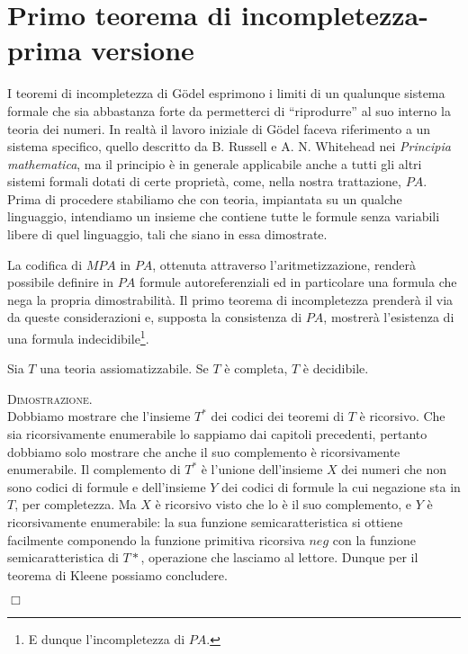 \section{Primo teorema di incompletezza-prima versione}

	I teoremi di incompletezza di G\"odel esprimono i limiti di un qualunque
	sistema formale che sia abbastanza forte da permetterci di ``riprodurre''
	al suo interno la teoria dei numeri. In realt\`a il lavoro iniziale di G\"odel
	faceva riferimento a un sistema specifico, quello descritto da B. Russell e
	A. N. Whitehead nei \textit{Principia ma\-the\-ma\-ti\-ca}, ma il principio
	\`e in generale applicabile anche a tutti gli altri sistemi formali dotati di
	certe propriet\`a, come, nella nostra trattazione, $PA$.\\
	Prima di procedere stabiliamo che con teoria, impiantata su un qualche
	linguaggio, intendiamo un insieme che contiene tutte le formule senza
	variabili libere di quel linguaggio, tali che siano in essa dimostrate.
		
	La codifica di $MPA$ in $PA$, ottenuta attraverso l'aritmetizzazione,
	render\`a possibile definire in $PA$ formule autoreferenziali ed in
	particolare una formula che nega la propria dimostrabilit\`a. Il primo
	teorema di incompletezza prender\`a il via da queste considerazioni e,
	supposta la consistenza di $PA$, mostrer\`a l'esistenza di una formula
	indecidibile\footnote{E dunque l'incompletezza di $PA$.}.

	\begin{prop}
	Sia $T$ una teoria assiomatizzabile. Se $T$ \`e completa, $T$ \`e decidibile.
	\end{prop}
	
	\textsc{Dimostrazione.}\\
	Dobbiamo mostrare che l'insieme $T^*$ dei codici dei teoremi di $T$
	\`e ricorsivo. Che sia ricorsivamente enumerabile lo sappiamo dai
	capitoli precedenti, pertanto dobbiamo solo mostrare che anche il
	suo complemento \`e ricorsivamente enumerabile. Il complemento di
	$T^*$ \`e l'unione dell'insieme $X$ dei numeri che non sono codici
	di formule e dell'insieme $Y$ dei codici di formule la cui negazione
	sta in $T$, per completezza. Ma $X$ \`e ricorsivo visto che lo \`e
	il suo complemento, e $Y$ \`e ricorsivamente enumerabile: la sua
	funzione semicaratteristica si ottiene facilmente componendo la
	funzione primitiva ricorsiva $neg$ con la funzione semicaratteristica
	di $T*$, operazione che lasciamo al lettore. Dunque per il teorema
	di Kleene possiamo concludere.
	\begin{flushright}$\Box$\end{flushright}

